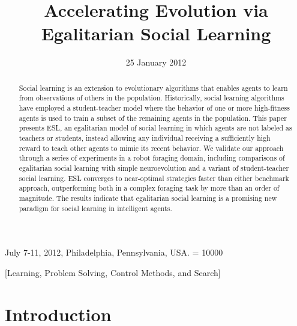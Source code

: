 \documentclass{sig-alternate}
\begin{document}
 {July 7-11, 2012, Philadelphia, Pennsylvania, USA.}
\widowpenalty = 10000
    
\title{Accelerating Evolution via Egalitarian Social Learning}

\date{25 January 2012}

\maketitle
\begin{abstract}
Social learning is an extension to evolutionary algorithms that enables agents to learn from observations of others in the population. Historically, social learning algorithms have employed a student-teacher model where the behavior of one or more high-fitness agents is used to train a subset of the remaining agents in the population. This paper presents ESL, an egalitarian model of social learning in which agents are not labeled as teachers or students, instead allowing any individual receiving a sufficiently high reward to teach other agents to mimic its recent behavior. We validate our approach through a series of experiments in a robot foraging domain, including comparisons of egalitarian social learning with simple neuroevolution and a variant of student-teacher social learning. ESL converges to near-optimal strategies faster than either benchmark approach, outperforming both in a complex foraging task by more than an order of magnitude. The results indicate that egalitarian social learning is a promising new paradigm for social learning in intelligent agents.
\end{abstract}

[Learning, Problem Solving, Control Methods, and Search]



\section{Introduction}
\end{document}
